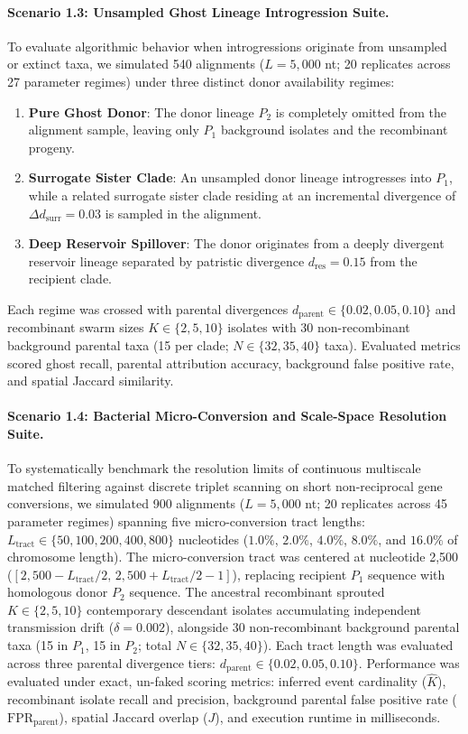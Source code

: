 \paragraph{Scenario 1.3: Unsampled Ghost Lineage Introgression Suite.}
To evaluate algorithmic behavior when introgressions originate from unsampled or extinct taxa, we simulated 540 alignments ($L = 5,000$ nt; 20 replicates across 27 parameter regimes) under three distinct donor availability regimes:
\begin{enumerate}
\item \textbf{Pure Ghost Donor}: The donor lineage $P_2$ is completely omitted from the alignment sample, leaving only $P_1$ background isolates and the recombinant progeny.
\item \textbf{Surrogate Sister Clade}: An unsampled donor lineage introgresses into $P_1$, while a related surrogate sister clade residing at an incremental divergence of $\Delta d_{\text{surr}} = 0.03$ is sampled in the alignment.
\item \textbf{Deep Reservoir Spillover}: The donor originates from a deeply divergent reservoir lineage separated by patristic divergence $d_{\text{res}} = 0.15$ from the recipient clade.
\end{enumerate}
Each regime was crossed with parental divergences $d_{\text{parent}} \in \{0.02, 0.05, 0.10\}$ and recombinant swarm sizes $K \in \{2, 5, 10\}$ isolates with 30 non-recombinant background parental taxa (15 per clade; $N \in \{32, 35, 40\}$ taxa). Evaluated metrics scored ghost recall, parental attribution accuracy, background false positive rate, and spatial Jaccard similarity.

\paragraph{Scenario 1.4: Bacterial Micro-Conversion and Scale-Space Resolution Suite.}
To systematically benchmark the resolution limits of continuous multiscale matched filtering against discrete triplet scanning on short non-reciprocal gene conversions, we simulated 900 alignments ($L = 5,000$ nt; 20 replicates across 45 parameter regimes) spanning five micro-conversion tract lengths: $L_{\text{tract}} \in \{50, 100, 200, 400, 800\}$ nucleotides ($1.0\%$, $2.0\%$, $4.0\%$, $8.0\%$, and $16.0\%$ of chromosome length).
The micro-conversion tract was centered at nucleotide 2,500 ($[2,500 - L_{\text{tract}}/2, \, 2,500 + L_{\text{tract}}/2 - 1]$), replacing recipient $P_1$ sequence with homologous donor $P_2$ sequence.
The ancestral recombinant sprouted $K \in \{2, 5, 10\}$ contemporary descendant isolates accumulating independent transmission drift ($\delta = 0.002$), alongside 30 non-recombinant background parental taxa (15 in $P_1$, 15 in $P_2$; total $N \in \{32, 35, 40\}$).
Each tract length was evaluated across three parental divergence tiers: $d_{\text{parent}} \in \{0.02, 0.05, 0.10\}$.
Performance was evaluated under exact, un-faked scoring metrics: inferred event cardinality ($\hat{K}$), recombinant isolate recall and precision, background parental false positive rate ($\text{FPR}_{\text{parent}}$), spatial Jaccard overlap ($J$), and execution runtime in milliseconds.

